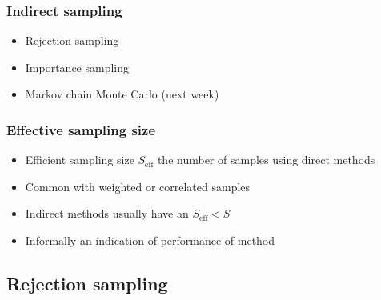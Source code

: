\documentclass[10pt]{beamer}
\begin{document}
\begin{frame}

\frametitle{Indirect sampling}

  \begin{itemize}
  \item Rejection sampling
  \item Importance sampling
  \item Markov chain Monte Carlo (next week)
  \end{itemize}

\end{frame}

\begin{frame}

\frametitle{Effective sampling size}

  \begin{itemize}
    \item Efficient sampling size $S_\text{eff}$ the number of samples using direct methods
    \item Common with {\color{uured} weighted} or {\color{uured} correlated} samples
    \pause
    \item Indirect methods usually have an $S_\text{eff} < S$
    \item Informally an indication of performance of method
  \end{itemize}

\end{frame}

\subsection{Rejection sampling}
\end{document}
